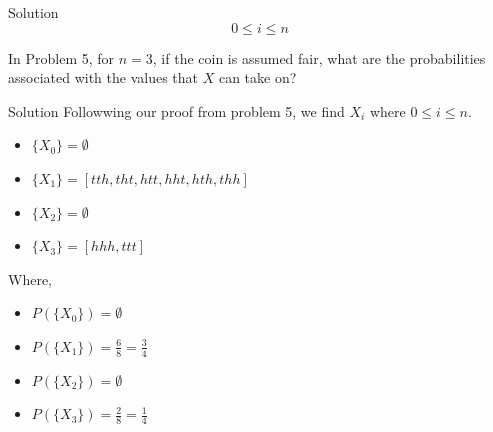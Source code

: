 \documentclass{article}
\begin{document}
\begin{spacing}{1.1}
\begin{homeworkProblem}
\begin{homeworkSection}{Solution}
    \[0 \le i \le n\]

  \end{homeworkSection}
\end{homeworkProblem}
\newpage
\begin{homeworkProblem}
In Problem 5, for $n = 3$, if the coin is assumed fair, what are 
the probabilities associated with the values that $X$ can take on?
  \begin{homeworkSection}{Solution}
    Followwing our proof from problem 5, we find $X_i$ where 
    $0 \le i \le n$.
    \begin{itemize}
      \item $\{X_0\} = \emptyset$
      \item $\{X_1\} = [tth, tht, htt, hht, hth, thh]$
      \item $\{X_2\} = \emptyset$
      \item $\{X_3\} = [hhh,ttt]$
    \end{itemize}
    Where,
    \begin{itemize}
      \item $P( \{X_0\}) = \emptyset$
      \item $P( \{X_1\}) = \frac{ 6}{ 8} = \frac{ 3}{ 4}$
      \item $P( \{X_2\}) = \emptyset$
      \item $P( \{X_3\}) = \frac{ 2}{ 8} = \frac{ 1}{ 4}$
    \end{itemize}
  \end{homeworkSection}
\end{homeworkProblem}
\end{spacing}
\end{document}
